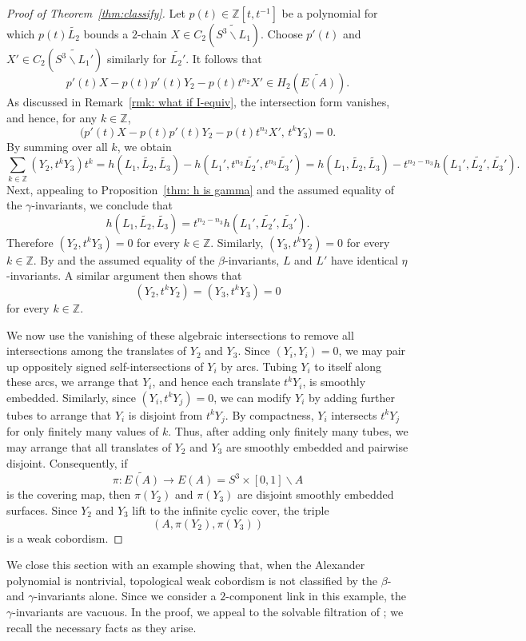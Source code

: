 \documentclass[a4paper, 11pt]{amsart}
\theoremstyle{definition}
\newcommand{\Z}{\mathbb{Z}}
\newcommand{\noteta}{h}
\begin{document}
\begin{proof}[Proof of Theorem~\ref{thm:classify}]
Let $p(t)\in \Z[t,t^{-1}]$ be a polynomial for which
$p(t)\widetilde{L_2}$ bounds a $2$-chain
$X\in C_2(\widetilde{S^3\smallsetminus L_1})$. Choose
$p'(t)$ and $X'\in C_2(\widetilde{S^3\smallsetminus L_1'})$
similarly for $\widetilde{L_2'}$. It follows that
\[
p'(t)X-p(t)p'(t)Y_2-p(t)t^{n_2}X' \in H_2(\widetilde{E(A)}).
\]
As discussed in Remark~\ref{rmk: what if I-equiv}, the intersection form vanishes, and hence, for any $k\in \Z$,
\[
\bigl(p'(t)X-p(t)p'(t)Y_2-p(t)t^{n_2}X',\, t^kY_3\bigr)=0.
\]
By summing over all $k$, we obtain
\[
\sum_{k\in \Z} (Y_2,t^kY_3)t^k
=
\noteta(L_1,\widetilde{L_2},\widetilde{L_3})
-
\noteta(L_1',t^{n_2}\widetilde{L_2'},t^{n_3}\widetilde{L_3'})=\noteta(L_1,\widetilde{L_2},\widetilde{L_3})
-
t^{n_2-n_3}\noteta(L_1',\widetilde{L_2'},\widetilde{L_3'}).
\]
Next, appealing to Proposition~\ref{thm: h is gamma} and the assumed equality of the $\gamma$-invariants, we conclude that
\[
\noteta(L_1,\widetilde{L_2},\widetilde{L_3})
=
t^{n_2-n_3}\noteta(L_1',\widetilde{L_2'},\widetilde{L_3'}).
\]
Therefore $(Y_2,t^kY_3)=0$ for every $k\in\Z$. Similarly, $(Y_3,t^kY_2)=0$ for every $k\in\Z$. By \cite[Theorem~7.1]{C3} and the assumed equality of the $\beta$-invariants, $L$ and $L'$ have identical $\eta$-invariants. A similar argument then shows that
\[
(Y_2,t^kY_2)=(Y_3,t^kY_3)=0
\]
for every $k\in\Z$.

We now use the vanishing of these algebraic intersections to remove all intersections among the translates of $Y_2$ and $Y_3$. Since $(Y_i,Y_i)=0$, we may pair up oppositely signed self-intersections of $Y_i$ by arcs. Tubing $Y_i$ to itself along these arcs, we arrange that $Y_i$, and hence each translate $t^kY_i$, is smoothly embedded. Similarly, since $(Y_i,t^kY_j)=0$, we can modify $Y_i$ by adding further tubes to arrange that $Y_i$ is disjoint from $t^kY_j$.
By compactness, $Y_i$ intersects $t^kY_j$ for only finitely many values of $k$. Thus, after adding only finitely many tubes, we may arrange that all translates of $Y_2$ and $Y_3$ are smoothly embedded and pairwise disjoint. Consequently, if
\[
\pi:\widetilde{E(A)}\to E(A)=S^3\times[0,1]\smallsetminus A
\]
is the covering map, then $\pi(Y_2)$ and $\pi(Y_3)$ are disjoint smoothly embedded surfaces. Since $Y_2$ and $Y_3$ lift to the infinite cyclic cover, the triple
\[
(A,\pi(Y_2),\pi(Y_3))
\]
is a weak cobordism.
\end{proof}

We close this section with an example showing that, when the Alexander polynomial is nontrivial, topological weak cobordism is not classified by the $\beta$- and $\gamma$-invariants alone. Since we consider a $2$-component link in this example, the $\gamma$-invariants are vacuous. In the proof, we appeal to the solvable filtration of \cite{COT03}; we recall the necessary facts as they arise.
\end{document}
